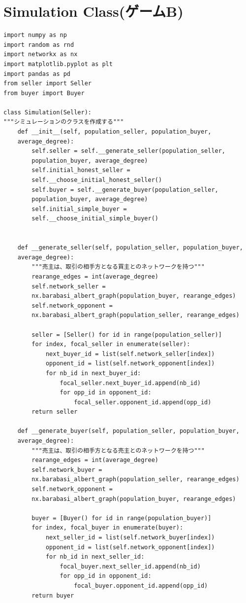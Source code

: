 \documentclass[a4paper,fontsize=11pt,report,notitlepage,line_length=38zw,number_of_lines=40,dvipdfmx]{jlreq}
\begin{document}
\section{Simulation Class(ゲームB)}
\begin{lstlisting}
import numpy as np
import random as rnd
import networkx as nx
import matplotlib.pyplot as plt
import pandas as pd
from seller import Seller
from buyer import Buyer

class Simulation(Seller):
"""シミュレーションのクラスを作成する"""        
    def __init__(self, population_seller, population_buyer, 
    average_degree):
        self.seller = self.__generate_seller(population_seller, 
        population_buyer, average_degree)
        self.initial_honest_seller = 
        self.__choose_initial_honest_seller()
        self.buyer = self.__generate_buyer(population_seller, 
        population_buyer, average_degree)
        self.initial_simple_buyer = 
        self.__choose_initial_simple_buyer()
        

    def __generate_seller(self, population_seller, population_buyer, 
    average_degree):
        """売主は、取引の相手方となる買主とのネットワークを持つ"""
        rearange_edges = int(average_degree)
        self.network_seller = 
        nx.barabasi_albert_graph(population_buyer, rearange_edges)
        self.network_opponent = 
        nx.barabasi_albert_graph(population_seller, rearange_edges)
        
        seller = [Seller() for id in range(population_seller)]
        for index, focal_seller in enumerate(seller):
            next_buyer_id = list(self.network_seller[index])
            opponent_id = list(self.network_opponent[index])
            for nb_id in next_buyer_id:
                focal_seller.next_buyer_id.append(nb_id)
                for opp_id in opponent_id:
                    focal_seller.opponent_id.append(opp_id)
        return seller

    def __generate_buyer(self, population_seller, population_buyer, 
    average_degree):
        """売主は、取引の相手方となる売主とのネットワークを持つ"""        
        rearange_edges = int(average_degree)
        self.network_buyer = 
        nx.barabasi_albert_graph(population_seller, rearange_edges)
        self.network_opponent = 
        nx.barabasi_albert_graph(population_buyer, rearange_edges)

        buyer = [Buyer() for id in range(population_buyer)]
        for index, focal_buyer in enumerate(buyer):
            next_seller_id = list(self.network_buyer[index])
            opponent_id = list(self.network_opponent[index])
            for nb_id in next_seller_id:
                focal_buyer.next_seller_id.append(nb_id)
                for opp_id in opponent_id:
                    focal_buyer.opponent_id.append(opp_id)
        return buyer


\end{lstlisting}
\end{document}
